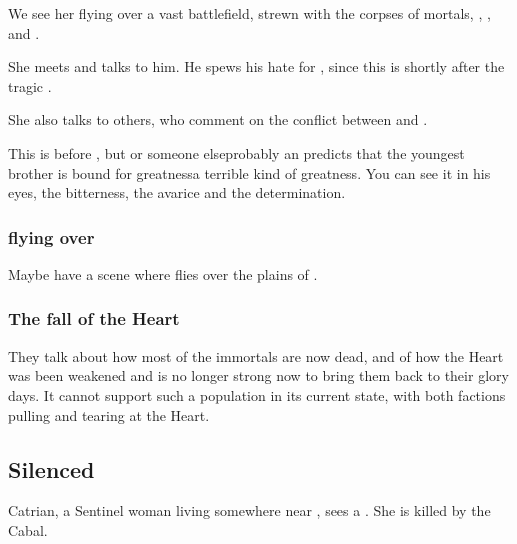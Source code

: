 We see her flying over a vast battlefield, strewn with the corpses of mortals, \dragons{}, \cuezcans, \banes{} and \resphain. 

She meets \Secherdamon{} and talks to him. 
He spews his hate for \Ishnaruchaefir{}, since this is shortly after the tragic . 

She also talks to others, who comment on the conflict between \Ishnaruchaefir{} and \Secherdamon. 

This is before , but \Nzessuacrith{} or someone else\dash probably an \ophidian\dash predicts that the youngest brother is bound for greatness\dash a terrible kind of greatness. 
You can see it in his eyes, the bitterness, the avarice and the determination. 





\subsubsection{\Nzessuacrith{} flying over \Machai}
Maybe have a scene where \Nzessuacrith{} flies over the plains of \Machai{}. 






\subsubsection{The fall of the Heart}
They talk about how most of the immortals are now dead, and of how the Heart was been weakened and is no longer strong now to bring them back to their glory days.
It cannot support such a population in its current state, with both factions pulling and tearing at the Heart. 









\subsection{Silenced}
Catrian, a Sentinel woman living somewhere near \Redce, sees a \bane{}. She is killed by the Cabal. 

